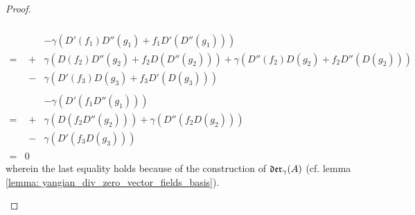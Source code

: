 \begin{proof}
\begin{enumerate}
$$\begin{aligned}
                                \\
                                = &
                                \begin{aligned}
                                    & -\gamma\left( D'(f_1) D''(g_1) + f_1 D' (D''(g_1)) \right)
                                    \\
                                    + & \gamma\left( D(f_2) D''(g_2) + f_2 D( D''(g_2) ) \right) + \gamma( D''(f_2) D(g_2) + f_2 D''( D(g_2) ) )
                                    \\
                                    - & \gamma\left( D'(f_3) D(g_3) + f_3 D'(D(g_3)) \right)
                                \end{aligned}
                                \\
                                = &
                                \begin{aligned}
                                    & -\gamma\left( D'( f_1 D''(g_1) ) \right)
                                    \\
                                    + & \gamma\left( D( f_2 D''(g_2) ) \right) + \gamma\left( D''( f_2 D(g_2) ) \right)
                                    \\
                                    - & \gamma\left( D'( f_3 D(g_3) ) \right)
                                \end{aligned}
                                \\
                                = & 0
                            \end{aligned}
                        $$
                    wherein the last equality holds because of the construction of $\mathfrak{der}_{\gamma}(A)$ (cf. lemma \ref{lemma: yangian_div_zero_vector_fields_basis}).
                \end{enumerate}


\end{proof}
